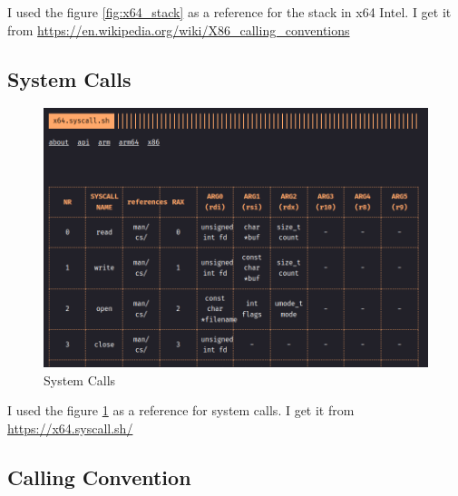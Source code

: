 \documentclass{article}
\begin{document}
I used the figure \ref{fig:x64_stack} as a reference for the stack in x64 Intel. I get it from \url{https://en.wikipedia.org/wiki/X86_calling_conventions}

\subsection{System Calls}

\begin{figure}[H]
    \centering
    \includegraphics[width=\textwidth]{syscalls.png}
    \caption{System Calls}
    \label{fig:syscalls}
\end{figure}

I used the figure \ref{fig:syscalls} as a reference for system calls. I get it from \url{https://x64.syscall.sh/}

\subsection{Calling Convention}
\end{document}
